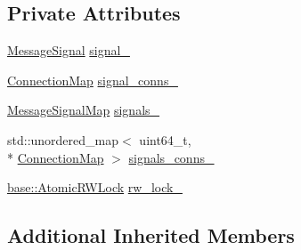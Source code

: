 \subsection*{Private Attributes}
\begin{DoxyCompactItemize}
\item 
\hyperlink{classapollo_1_1cyber_1_1transport_1_1ListenerHandler_a9ca5ce35c021aae1145e8e25a5fda0a0}{Message\-Signal} \hyperlink{classapollo_1_1cyber_1_1transport_1_1ListenerHandler_ac43fe4e3f5d7bbd16f21606f19cb349e}{signal\-\_\-}
\item 
\hyperlink{classapollo_1_1cyber_1_1transport_1_1ListenerHandler_a5a6f5bc05280412183b1d0f65ce5e683}{Connection\-Map} \hyperlink{classapollo_1_1cyber_1_1transport_1_1ListenerHandler_a305d0d57ad20695d87607abc21d50d37}{signal\-\_\-conns\-\_\-}
\item 
\hyperlink{classapollo_1_1cyber_1_1transport_1_1ListenerHandler_ab534f02021dc0d897b0f1161a604b835}{Message\-Signal\-Map} \hyperlink{classapollo_1_1cyber_1_1transport_1_1ListenerHandler_ac550b705bbbc6a60cb13d5208db3a716}{signals\-\_\-}
\item 
std\-::unordered\-\_\-map$<$ uint64\-\_\-t, \\*
\hyperlink{classapollo_1_1cyber_1_1transport_1_1ListenerHandler_a5a6f5bc05280412183b1d0f65ce5e683}{Connection\-Map} $>$ \hyperlink{classapollo_1_1cyber_1_1transport_1_1ListenerHandler_aae870e557a50628cfe739df1a8ab6547}{signals\-\_\-conns\-\_\-}
\item 
\hyperlink{classapollo_1_1cyber_1_1base_1_1AtomicRWLock}{base\-::\-Atomic\-R\-W\-Lock} \hyperlink{classapollo_1_1cyber_1_1transport_1_1ListenerHandler_adc3e16ad07f7ae7fd46fcd905880f216}{rw\-\_\-lock\-\_\-}
\end{DoxyCompactItemize}
\subsection*{Additional Inherited Members}


